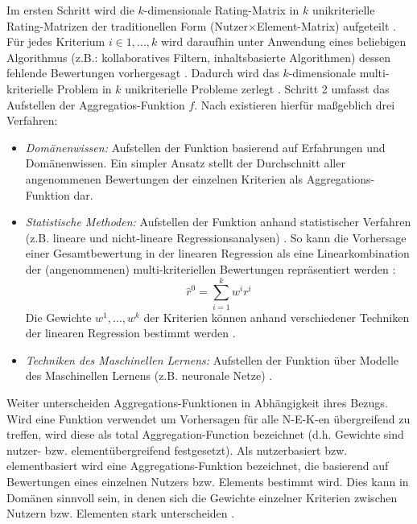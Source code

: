 Im ersten Schritt wird die $k$-dimensionale Rating-Matrix in $k$ unikriterielle Rating-Matrizen der traditionellen Form (Nutzer$\times$Element-Matrix) aufgeteilt \cite[S. 53]{adomavicius:inproceedings:2}.
Für jedes Kriterium $i \in {1,...,k}$ wird daraufhin unter Anwendung eines beliebigen Algorithmus (z.B.: kollaboratives Filtern, inhaltsbasierte Algorithmen) dessen fehlende Bewertungen vorhergesagt \cite[S. 428]{recommenderSystems:2016}.
Dadurch wird das $k$-dimensionale multi-kriterielle Problem in $k$ unikriterielle Probleme zerlegt \cite[S. 861]{adomavicius:4:inbook}.
Schritt 2 umfasst das Aufstellen der Aggregatios-Funktion $f$.
Nach \textcite[S. 53]{adomavicius:inproceedings:2} existieren hierfür maßgeblich drei Verfahren:
\begin{itemize}
    \item \textit{Domänenwissen:} Aufstellen der Funktion basierend auf Erfahrungen und Domänenwissen. Ein simpler Ansatz stellt der Durchschnitt aller angenommenen Bewertungen der einzelnen Kriterien als Aggregations-Funktion dar.
    \item \textit{Statistische Methoden:} Aufstellen der Funktion anhand statistischer Verfahren (z.B. lineare und nicht-lineare Regressionsanalysen) \cite[S. 53]{adomavicius:inproceedings:2}. So kann die Vorhersage einer Gesamtbewertung in der linearen Regression als eine Linearkombination der (angenommenen) multi-kriteriellen Bewertungen repräsentiert werden \cite[S. 429]{recommenderSystems:2016}:
    \begin{equation}\label{eq23}
        \hat{r}^{0} = \sum\limits_{i=1}^{k}w^{i} r^{i}
    \end{equation}
    Die Gewichte $w^{1}, ..., w^{k}$ der Kriterien können anhand verschiedener Techniken der linearen Regression bestimmt werden \cite[S. 429]{recommenderSystems:2016}.
    \item \textit{Techniken des Maschinellen Lernens:} Aufstellen der Funktion über Modelle des Maschinellen Lernens (z.B. neuronale Netze) \cite[S. 53]{adomavicius:inproceedings:2}.
\end{itemize}
Weiter unterscheiden \textcite[S. 53]{adomavicius:inproceedings:2} Aggregations-Funk\-tionen in Abhängigkeit ihres Bezugs.
Wird eine Funktion verwendet um Vorhersagen für alle \ac{N-E-K}-en übergreifend zu treffen, wird diese als total Aggregation-Function bezeichnet (d.h. Gewichte sind nutzer- bzw. elementübergreifend festgesetzt).
Als nutzerbasiert bzw. elementbasiert wird eine Aggregations-Funktion bezeichnet, die basierend auf Bewertungen eines einzelnen Nutzers bzw. Elements bestimmt wird.
Dies kann in Domänen sinnvoll sein, in denen sich die Gewichte einzelner Kriterien zwischen Nutzern bzw. Elementen stark unterscheiden \cite[S. 53]{adomavicius:inproceedings:2}.

